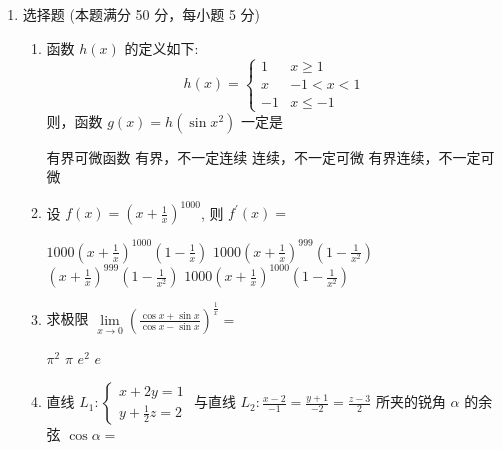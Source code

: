 
\begin{enumerate}
	\item
	选择题 (本题满分 50 分，每小题 5 分)
\begin{enumerate}
	\item
	函数 $h(x)$ 的定义如下:
	\[
	h(x)=\left\{\begin{array}{ll}
		1 & x \geqslant 1 \\
		x & -1<x<1 \\
		-1 & x \leqslant-1
	\end{array}\right.
	\]
	则，函数 $g(x)=h\left(\sin x^{2}\right)$ 一定是  
	

\fourchoices
{有界可微函数}
{有界，不一定连续}
{连续，不一定可微}
{有界连续，不一定可微}

\item 
设 $f(x)=\left(x+\frac{1}{x}\right)^{1000}$, 则 $f^{\prime}(x)=$  


\fourchoices
{$1000\left(x+\frac{1}{x}\right)^{1000}\left(1-\frac{1}{x}\right)$}
{$1000\left(x+\frac{1}{x}\right)^{999}\left(1-\frac{1}{x^{2}}\right)$}
{$\left(x+\frac{1}{x}\right)^{999}\left(1-\frac{1}{x^{2}}\right)$}
{$1000\left(x+\frac{1}{x}\right)^{1000}\left(1-\frac{1}{x^{2}}\right)$}

\item 
求极限 $\lim\limits _{x \rightarrow 0}\left(\frac{\cos x+\sin x}{\cos x-\sin x}\right)^{\frac{1}{x}}=$  


\fourchoices
{$\pi^{2}$}
{$\pi$}
{$e^{2}$}
{$e$}

\item 
直线 $L_{1}:\left\{\begin{array}{l}x+2 y=1 \\ y+\frac{1}{2} z=2\end{array} \right.$ 与直线 $L_{2}: \frac{x-2}{-1}=\frac{y+1}{-2}=\frac{z-3}{2}$ 所夹的锐角 $\alpha$ 的余弦 $\cos \alpha=$  


\end{enumerate}
\end{enumerate}
